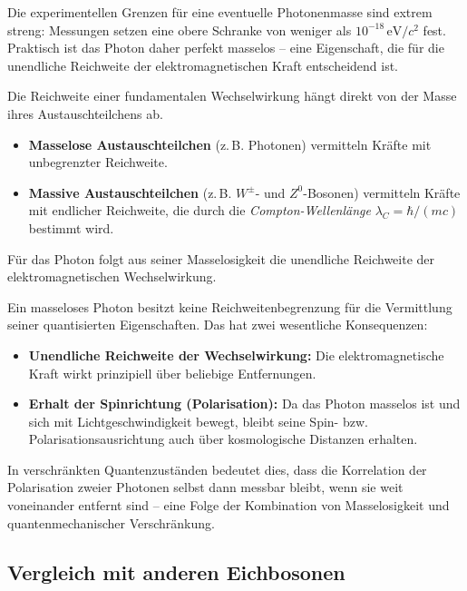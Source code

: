 Die experimentellen Grenzen für eine eventuelle Photonenmasse sind extrem streng:  
Messungen setzen eine obere Schranke von weniger als \(10^{-18}\,\mathrm{eV}/c^2\) fest.  
Praktisch ist das Photon daher perfekt masselos – eine Eigenschaft, die für die unendliche Reichweite der elektromagnetischen Kraft entscheidend ist.
\medskip
\begin{tcolorbox}[hinweisbox, title=Masselosigkeit und Reichweite]
	\label{box:reichweite_masselos}
	\small
	Die Reichweite einer fundamentalen Wechselwirkung hängt direkt von der Masse ihres Austauschteilchens ab.  
	\begin{itemize}
		\item \textbf{Masselose Austauschteilchen} (z.\,B. Photonen) vermitteln Kräfte mit unbegrenzter Reichweite.  
		\item \textbf{Massive Austauschteilchen} (z.\,B. \(W^\pm\)- und \(Z^0\)-Bosonen) vermitteln Kräfte mit endlicher Reichweite, die durch die \emph{Compton-Wellenlänge} \(\lambda_C = \hbar/(mc)\) bestimmt wird.
	\end{itemize}
	Für das Photon folgt aus seiner Masselosigkeit die unendliche Reichweite der elektromagnetischen Wechselwirkung.
\end{tcolorbox}
\medskip
\begin{tcolorbox}[physikbox, title=Masseloses Photon und Spinwirkung über große Distanzen]
	\label{box:photon_spin_reichweite}
	\small
	Ein masseloses Photon besitzt keine Reichweitenbegrenzung für die Vermittlung seiner quantisierten Eigenschaften.  
	Das hat zwei wesentliche Konsequenzen:
	\begin{itemize}
		\item \textbf{Unendliche Reichweite der Wechselwirkung:} Die elektromagnetische Kraft wirkt prinzipiell über beliebige Entfernungen.
		\item \textbf{Erhalt der Spinrichtung (Polarisation):} Da das Photon masselos ist und sich mit Lichtgeschwindigkeit bewegt, bleibt seine Spin- bzw. Polarisationsausrichtung auch über kosmologische Distanzen erhalten. 
	\end{itemize}
	In verschränkten Quantenzuständen bedeutet dies, dass die Korrelation der Polarisation zweier Photonen selbst dann messbar bleibt, wenn sie weit voneinander entfernt sind – eine Folge der Kombination von Masselosigkeit und quantenmechanischer Verschränkung.
\end{tcolorbox}


\subsection{Vergleich mit anderen Eichbosonen}

